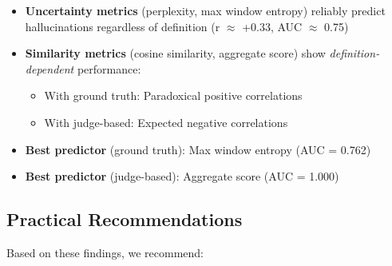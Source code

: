 \begin{itemize}
    \item \textbf{Uncertainty metrics} (perplexity, max window entropy) reliably predict hallucinations regardless of definition (r $\approx$ +0.33, AUC $\approx$ 0.75)
    
    \item \textbf{Similarity metrics} (cosine similarity, aggregate score) show \textit{definition-dependent} performance:
    \begin{itemize}
        \item With ground truth: Paradoxical positive correlations
        \item With judge-based: Expected negative correlations
    \end{itemize}
    
    \item \textbf{Best predictor} (ground truth): Max window entropy (AUC = 0.762)
    
    \item \textbf{Best predictor} (judge-based): Aggregate score (AUC = 1.000)
\end{itemize}

\subsection{Practical Recommendations}

Based on these findings, we recommend:

